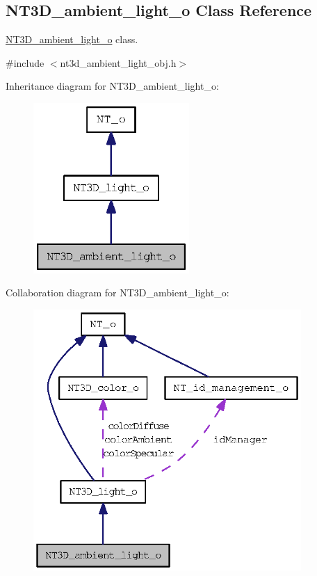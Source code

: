 \subsection{NT3D\_\-ambient\_\-light\_\-o Class Reference}
\label{class_n_t3_d__ambient__light__o}


\hyperlink{class_n_t3_d__ambient__light__o}{NT3D\_\-ambient\_\-light\_\-o} class.  




{\ttfamily \#include $<$nt3d\_\-ambient\_\-light\_\-obj.h$>$}



Inheritance diagram for NT3D\_\-ambient\_\-light\_\-o:
\nopagebreak
\begin{figure}[H]
\begin{center}
\leavevmode
\includegraphics[width=168pt]{class_n_t3_d__ambient__light__o__inherit__graph}
\end{center}
\end{figure}


Collaboration diagram for NT3D\_\-ambient\_\-light\_\-o:
\nopagebreak
\begin{figure}[H]
\begin{center}
\leavevmode
\includegraphics[width=289pt]{class_n_t3_d__ambient__light__o__coll__graph}
\end{center}
\end{figure}
